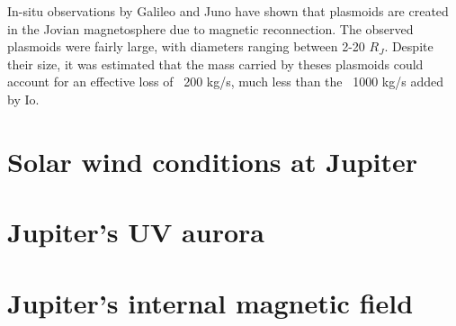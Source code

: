 In-situ observations by Galileo and Juno have shown that plasmoids are created in the Jovian magnetosphere due to magnetic reconnection. The observed plasmoids were fairly large, with diameters ranging between 2-20 $R_J$. Despite their size, it was estimated that the mass carried by theses plasmoids could account for an effective loss of ~200 kg/s, much less than the ~1000 kg/s added by Io. 


\section{Solar wind conditions at Jupiter}
\section{Jupiter's UV aurora}
\section{Jupiter's internal magnetic field}


